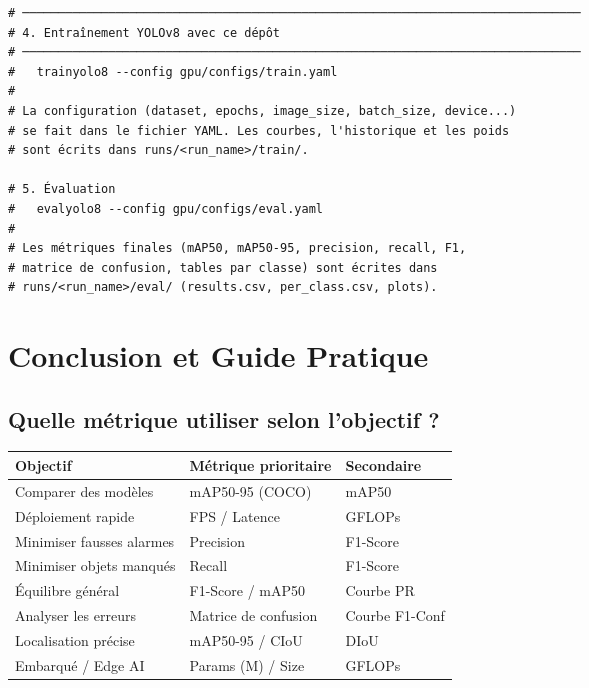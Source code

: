 \documentclass[12pt, a4paper]{report}
\begin{document}
\begin{lstlisting}[style=python, caption={Calcul des métriques de base avec NumPy},
  label={lst:metrics_numpy}]
# ──────────────────────────────────────────────────────────────────────────────
# 4. Entraînement YOLOv8 avec ce dépôt
# ──────────────────────────────────────────────────────────────────────────────
#   trainyolo8 --config gpu/configs/train.yaml
#
# La configuration (dataset, epochs, image_size, batch_size, device...)
# se fait dans le fichier YAML. Les courbes, l'historique et les poids
# sont écrits dans runs/<run_name>/train/.

# 5. Évaluation
#   evalyolo8 --config gpu/configs/eval.yaml
#
# Les métriques finales (mAP50, mAP50-95, precision, recall, F1,
# matrice de confusion, tables par classe) sont écrites dans
# runs/<run_name>/eval/ (results.csv, per_class.csv, plots).
\end{lstlisting}

\chapter{Conclusion et Guide Pratique}

\section{Quelle métrique utiliser selon l'objectif ?}

\begin{center}
\begin{tabular}{p{4.5cm} p{5cm} p{4cm}}
  \toprule
  \textbf{Objectif} & \textbf{Métrique prioritaire} & \textbf{Secondaire} \\
  \midrule
  Comparer des modèles & mAP50-95 (COCO) & mAP50 \\
  Déploiement rapide & FPS / Latence & GFLOPs \\
  Minimiser fausses alarmes & Precision & F1-Score \\
  Minimiser objets manqués & Recall & F1-Score \\
  Équilibre général & F1-Score / mAP50 & Courbe PR \\
  Analyser les erreurs & Matrice de confusion & Courbe F1-Conf \\
  Localisation précise & mAP50-95 / CIoU & DIoU \\
  Embarqué / Edge AI & Params (M) / Size & GFLOPs \\
  \bottomrule
\end{tabular}
\end{center}
\end{document}
